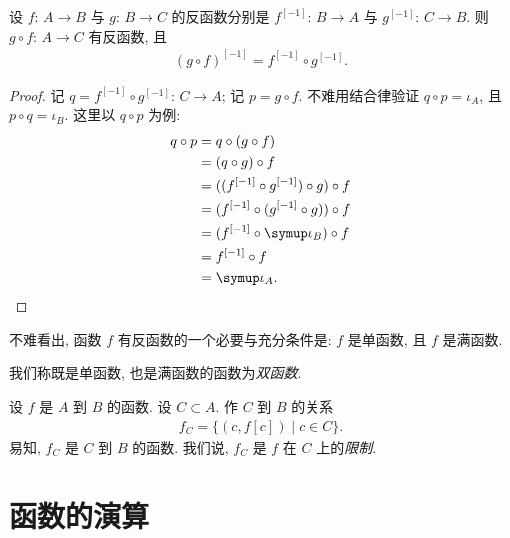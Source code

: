 \begin{theorem}
    设 $f$: $A \to B$ 与 $g$: $B \to C$ 的反函数分别是 $f^{[-1]}$: $B \to A$ 与 $g^{[-1]}$: $C \to B$. 则 $g \circ f$: $A \to C$ 有反函数, 且
    \begin{align*}
        {(g \circ f)}^{[-1]} = f^{[-1]} \circ g^{[-1]}.
    \end{align*}
\end{theorem}

\begin{proof}
    记 $q = f^{[-1]} \circ g^{[-1]}$: $C \to A$; 记 $p = g \circ f$. 不难用结合律验证 $q \circ p = \iota_A$, 且 $p \circ q = \iota_B$. 这里以 $q \circ p$ 为例:
    \begin{align*}
        q \circ p
        = {} & q \circ (g \circ f)                         \\
        = {} & (q \circ g) \circ f                         \\
        = {} & ((f^{[-1]} \circ g^{[-1]}) \circ g) \circ f \\
        = {} & (f^{[-1]} \circ (g^{[-1]} \circ g)) \circ f \\
        = {} & (f^{[-1]} \circ \iota_B) \circ f            \\
        = {} & f^{[-1]} \circ f                            \\
        = {} & \iota_A. \qedhere
    \end{align*}
\end{proof}

\begin{remark}
    不难看出, 函数 $f$ 有反函数的一个必要与充分条件是: $f$ 是单函数, 且 $f$ 是满函数.

    我们称既是单函数, 也是满函数的函数为\emph{双函数}.
\end{remark}

\begin{definition}
    设 $f$ 是 $A$ 到 $B$ 的函数. 设 $C \subset A$. 作 $C$ 到 $B$ 的关系
    \begin{align*}
        f_C = \{ (c, f[c]) \mid c \in C \}.
    \end{align*}
    易知, $f_C$ 是 $C$ 到 $B$ 的函数. 我们说, $f_C$ 是 $f$ 在 $C$ 上的\emph{限制}.
\end{definition}

\section{函数的演算}

